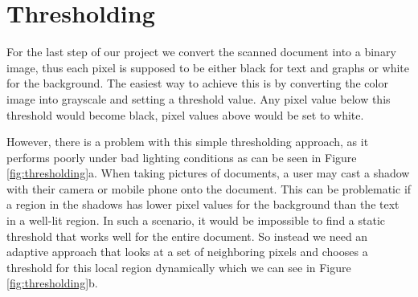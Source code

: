 \documentclass[bibliography=totoc]{scrartcl}
\begin{document}
\section{Thresholding}
For the last step of our project we convert the scanned document into a binary image, thus each pixel is supposed to be either black for text and graphs or white for the background.
The easiest way to achieve this is by converting the color image into grayscale and setting a threshold value.
Any pixel value below this threshold would become black, pixel values above would be set to white.

However, there is a problem with this simple thresholding approach, as it performs poorly under bad lighting conditions as can be seen in Figure \ref{fig:thresholding}a.
When taking pictures of documents, a user may cast a shadow with their camera or mobile phone onto the document.
This can be problematic if a region in the shadows has lower pixel values for the background than the text in a well-lit region.
In such a scenario, it would be impossible to find a static threshold that works well for the entire document.
So instead we need an adaptive approach that looks at a set of neighboring pixels and chooses a threshold for this local region dynamically which we can see in Figure \ref{fig:thresholding}b. \\
\end{document}

